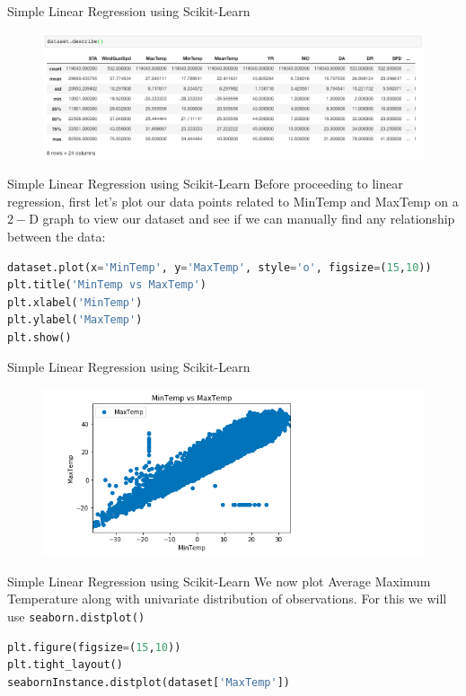 \documentclass[12pt,xcolor={dvipsnames}]{beamer}
\begin{document}
\begin{frame}{Simple Linear Regression using Scikit-Learn}
\begin{figure}
\centering
\includegraphics[scale=0.3]{LR_Reg3.png}
\end{figure}
\end{frame}

\begin{frame}[fragile]{Simple Linear Regression using Scikit-Learn}
Before proceeding to linear regression, first let's plot our data points related to MinTemp and MaxTemp on a $2-$D graph to view our
dataset and see if we can manually find any relationship between the data:
\begin{lstlisting}[language=Python]
dataset.plot(x='MinTemp', y='MaxTemp', style='o', figsize=(15,10))
plt.title('MinTemp vs MaxTemp')
plt.xlabel('MinTemp')
plt.ylabel('MaxTemp')
plt.show()
\end{lstlisting}
\end{frame}

\begin{frame}{Simple Linear Regression using Scikit-Learn}
\begin{figure}
\centering
\includegraphics[scale=0.6]{LR_Reg4.png}
\end{figure}
\end{frame}

\begin{frame}[fragile]{Simple Linear Regression using Scikit-Learn}
We now plot Average Maximum Temperature along with univariate distribution of observations. For this we will use  \lstinline[language=Python]!seaborn.distplot()!
\begin{lstlisting}[language=Python]
plt.figure(figsize=(15,10))
plt.tight_layout()
seabornInstance.distplot(dataset['MaxTemp'])
\end{lstlisting}
\end{frame}
\end{document}
